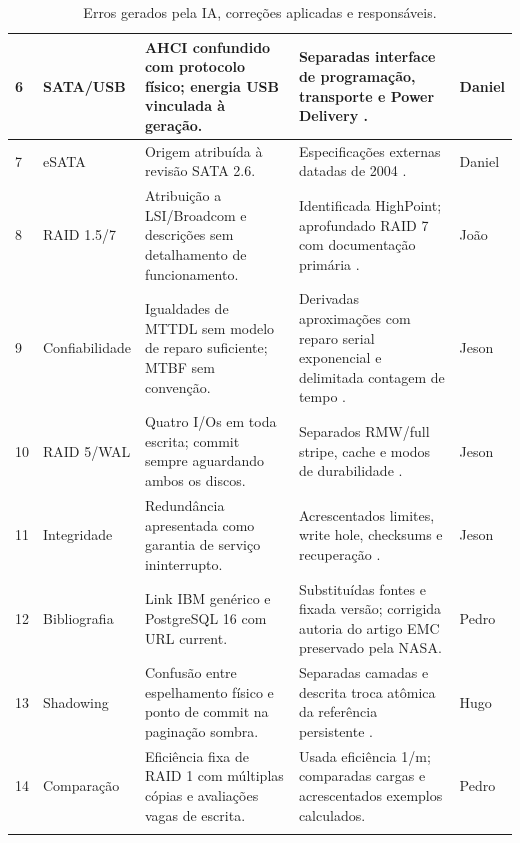 \documentclass[titlepage]{article}
\begin{document}
\begin{longtable}{|p{}|p{}|p{}|p{}|p{}|}
\hline
6 & SATA/USB & AHCI confundido com protocolo físico; energia USB vinculada à geração. & Separadas interface de programação, transporte e Power Delivery \cite{intel_ahci,usb_pd}. & Daniel \\
\hline
7 & eSATA & Origem atribuída à revisão SATA 2.6. & Especificações externas datadas de 2004 \cite{sata_esata}. & Daniel \\
\hline
8 & RAID 1.5/7 & Atribuição a LSI/Broadcom e descrições sem detalhamento de funcionamento. & Identificada HighPoint; aprofundado RAID 7 com documentação primária \cite{highpoint_15,storagecomputer_7}. & João \\
\hline
9 & Confiabilidade & Igualdades de MTTDL sem modelo de reparo suficiente; MTBF sem convenção. & Derivadas aproximações com reparo serial exponencial e delimitada contagem de tempo \cite{nist_mtbf}. & Jeson \\
\hline
10 & RAID 5/WAL & Quatro I/Os em toda escrita; commit sempre aguardando ambos os discos. & Separados RMW/full stripe, cache e modos de durabilidade \cite{raid5_io,postgresql_wal_config}. & Jeson \\
\hline
11 & Integridade & Redundância apresentada como garantia de serviço ininterrupto. & Acrescentados limites, write hole, checksums e recuperação \cite{spdk_raid5f,krioukov2008}. & Jeson \\
\hline
12 & Bibliografia & Link IBM genérico e PostgreSQL 16 com URL current. & Substituídas fontes e fixada versão; corrigida autoria do artigo EMC preservado pela NASA. & Pedro \\
\hline
13 & Shadowing & Confusão entre espelhamento físico e ponto de commit na paginação sombra. & Separadas camadas e descrita troca atômica da referência persistente \cite{dbbook_storage,elmasri2016}. & Hugo \\
\hline
14 & Comparação & Eficiência fixa de RAID 1 com múltiplas cópias e avaliações vagas de escrita. & Usada eficiência 1/m; comparadas cargas e acrescentados exemplos calculados. & Pedro \\
\hline
\caption{Erros gerados pela IA, correções aplicadas e responsáveis.}
\label{tab:erros_ia} \\
\end{longtable}
\endgroup

\clearpage
{}
{}
\renewcommand{\refname}{Referências bibliográficas}


\end{document}
